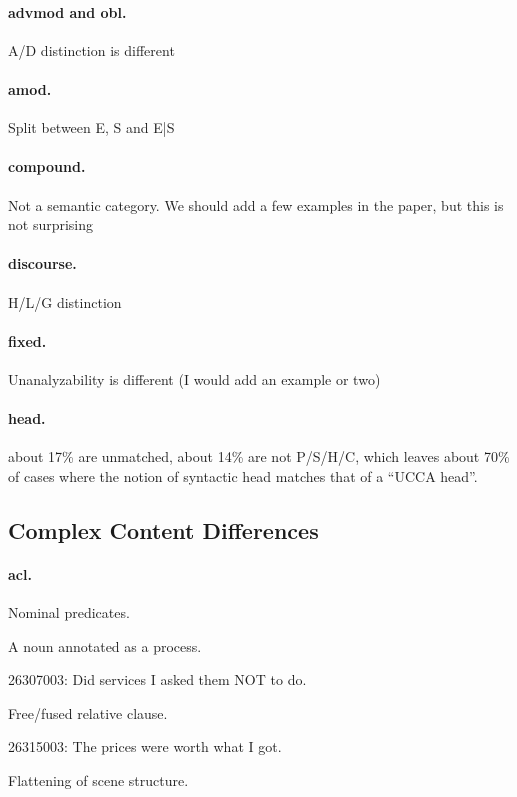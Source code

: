 \documentclass[11pt,a4paper]{article}
\begin{document}
\paragraph{advmod and obl.}
A/D distinction is different

\paragraph{amod.}
Split between E, S and E|S

\paragraph{compound.}
Not a semantic category. We should add a few examples in the paper, but this is not surprising

\paragraph{discourse.}
H/L/G distinction

\paragraph{fixed.}
Unanalyzability is different (I would add an example or two)

\paragraph{head.}
about 17\% are unmatched, about 14\% are not P/S/H/C, which
leaves about 70\% of cases where the notion of syntactic head matches
that of a ``UCCA head''.



\subsection{Complex Content Differences}

\paragraph{acl.}

Nominal predicates.

A noun annotated as a process.

26307003:
Did services I asked them NOT to do.

Free/fused relative clause.

26315003:
The prices were worth what I got.

Flattening of scene structure.
\end{document}
